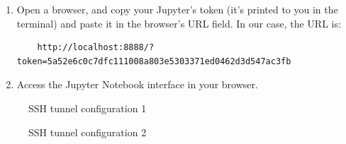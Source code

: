 \begin{enumerate}
\item Open a browser, and copy your Jupyter's token (it's printed to you in the terminal)
and paste it in the browser's URL field. In our case, the URL is:
\small
\begin{verbatim}
    http://localhost:8888/?token=5a52e6c0c7dfc111008a803e5303371ed0462d3d547ac3fb
\end{verbatim}
\normalsize

\item Access the Jupyter Notebook interface in your browser.
\end{enumerate}

\begin{figure}[htbp]
	\centering
	\caption{SSH tunnel configuration 1}
	\label{fig:putty1}
\end{figure}

\begin{figure}[htbp]
	\centering
	\caption{SSH tunnel configuration 2}
	\label{fig:putty2}
\end{figure}

